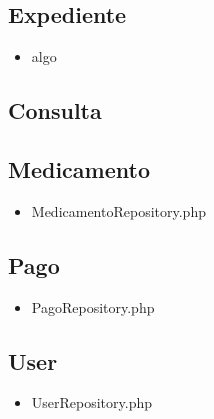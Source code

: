 		\subsection{Expediente}
		\begin{itemize}
			\item algo
		\end{itemize}
		\subsection{Consulta}
		
		\subsection{Medicamento}
		\begin{itemize}
		\item MedicamentoRepository.php
		\end{itemize}
		\subsection{Pago}
		\begin{itemize}
			\item PagoRepository.php
		\end{itemize}
		\subsection{User}
		\begin{itemize}
			\item UserRepository.php
		\end{itemize}%



